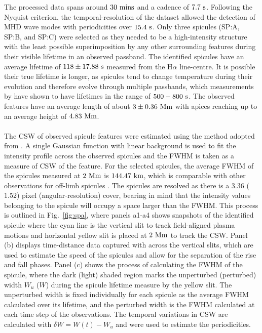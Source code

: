 \documentclass[12pt]{ociamthesis}
\newcommand{\np}{\\ \\}
\begin{document}
%
The processed data spans around $30~\rm{mins}$ and a cadence of $7.7~\rm{s}$. Following the Nyquist criterion, the temporal-resolution of the dataset allowed the detection of MHD wave modes with periodicities over $15.4~\rm{s}$. Only three spicules (SP:A, SP:B, and SP:C) were selected as they needed to be a high-intensity structure with the least possible superimposition by any other surrounding features during their visible lifetime in an observed passband. The identified spicules have an average lifetime of $118\pm 17.88~\rm{s}$ measured from the H$\alpha$ line-centre. It is possible their true lifetime is longer, as spicules tend to change temperature during their evolution and therefore evolve through multiple passbands, which measurements by \cite{Pereira2014} have shown to have lifetimes in the range of $500-800~\rm{s}$. The observed features have an average length of about $3\pm0.36~\rm{Mm}$ with apices reaching up to an average height of $4.83~\rm{Mm}$. \np
%
The CSW of observed spicule features were estimated using the method adopted from \citet{Sharma2018}. A single Gaussian function with linear background is used to fit the intensity profile across the observed spicules and the FWHM is taken as a measure of CSW of the feature. For the selected spicules, the average FWHM of the spicules measured at $2~\rm{Mm}$ is $144.47~\rm{km}$, which is comparable with other observations for off-limb spicules \citep{Sharma2018}. The spicules are resolved as there is a $3.36$ ($1.52$) pixel (angular-resolution) cover, bearing in mind that the intensity values belonging to the spicule will occupy a space larger than the FWHM. This process is outlined in Fig.~\ref{fig:spa}, where panels a1-a4 shows snapshots of the identified spicule where the cyan line is the vertical slit to track field-aligned plasma motions and horizontal yellow slit is placed at $2~\rm{Mm}$ to track the CSW. Panel (b) displays time-distance data captured with across the vertical slits, which are used to estimate the speed of the spicules and allow for the separation of the rise and fall phases. Panel (c) shows the process of calculating the FWHM of the spicule, where the dark (light) shaded region marks the unperturbed (perturbed) width $W_u$ ($W$) during the spicule lifetime measure by the yellow slit. The unperturbed width is fixed individually for each spicule as the average FWHM calculated over its lifetime, and the perturbed width is the FWHM calculated at each time step of the observations. The temporal variations in CSW are calculated with $\delta W = W(t) - W_{u}$ and were used to estimate the periodicities. \np
\end{document}

